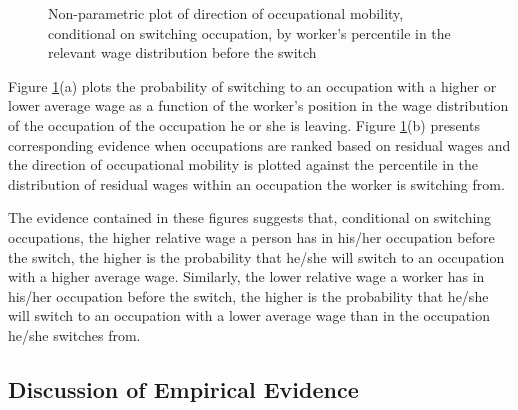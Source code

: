 \documentclass[12pt]{article}
\newcommand{\highlightPP}[1]{{\emph{\color{MyPurple}{#1}}}}
\theoremstyle{definition}
\begin{document}
\begin{figure}[H]
    \noindent\caption{Non-parametric plot of direction of occupational mobility, conditional on switching occupation, by worker's percentile in the relevant wage distribution before the switch}
    \begin{center}
        \label{groesUShapesOccupationalMobility2015_fig3}
    \end{center}
\end{figure}

Figure \ref{groesUShapesOccupationalMobility2015_fig3}(a) plots the probability of switching to an occupation with a higher or lower average wage as a function of the worker's position in the wage distribution of the occupation of the occupation he or she is leaving. \highlightPP{The sample on which the figure is based consists of all workers who switched occupation in a given year and occupations are ranked based on the raw average wages.} Figure \ref{groesUShapesOccupationalMobility2015_fig3}(b) presents corresponding evidence when occupations are ranked based on residual wages and the direction of occupational mobility is plotted against the percentile in the distribution of residual wages within an occupation the worker is switching from. 

The evidence contained in these figures suggests that, conditional on switching occupations, the higher relative wage a person has in his/her occupation before the switch, the higher is the probability that he/she will switch to an occupation with a higher average wage. Similarly, the lower relative wage a worker has in his/her occupation before the switch, the higher is the probability that he/she will switch to an occupation with a lower average wage than in the occupation he/she switches from.

\subsection{Discussion of Empirical Evidence}
\end{document}
